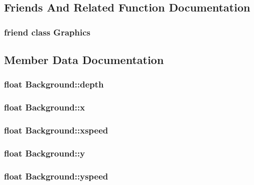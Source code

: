 \subsection{Friends And Related Function Documentation}
\hypertarget{class_background_ae5cfe0c0e0b06d536d5814bd1ff4818f}{
\subsubsection[{Graphics}]{\setlength{\rightskip}{0pt plus 5cm}friend class {\bf Graphics}\hspace{0.3cm}{\ttfamily [friend]}}}\label{class_background_ae5cfe0c0e0b06d536d5814bd1ff4818f}


\subsection{Member Data Documentation}
\hypertarget{class_background_a5df71997c2d1628f4e2d6d9c1cd08e08}{
\subsubsection[{depth}]{\setlength{\rightskip}{0pt plus 5cm}float Background\-::depth}}\label{class_background_a5df71997c2d1628f4e2d6d9c1cd08e08}
\hypertarget{class_background_af6650023418d2982420370f87eeff2de}{
\subsubsection[{x}]{\setlength{\rightskip}{0pt plus 5cm}float Background\-::x}}\label{class_background_af6650023418d2982420370f87eeff2de}
\hypertarget{class_background_a9519d783cf9640d9889a79424bab2f4e}{
\subsubsection[{xspeed}]{\setlength{\rightskip}{0pt plus 5cm}float Background\-::xspeed}}\label{class_background_a9519d783cf9640d9889a79424bab2f4e}
\hypertarget{class_background_adb462ce7dc04d3b09698f1baa3d173e6}{
\subsubsection[{y}]{\setlength{\rightskip}{0pt plus 5cm}float Background\-::y}}\label{class_background_adb462ce7dc04d3b09698f1baa3d173e6}
\hypertarget{class_background_a7335929df2f4e7fbd31014d8f14a4b81}{
\subsubsection[{yspeed}]{\setlength{\rightskip}{0pt plus 5cm}float Background\-::yspeed}}\label{class_background_a7335929df2f4e7fbd31014d8f14a4b81}



